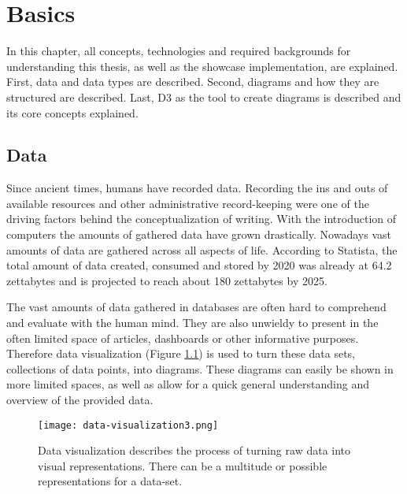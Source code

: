 \chapter{Basics}

In this chapter, all concepts, technologies and required backgrounds for understanding this thesis, as well as the showcase implementation, are explained. First, data and data types are described. Second, diagrams and how they are structured are described. Last, D3 as the tool to create diagrams is described and its core concepts explained.


\section{Data}

Since ancient times, humans have recorded data. Recording the ins and outs of available resources and other administrative record-keeping were one of the driving factors behind the conceptualization of writing\cite{senner1991origins}.
With the introduction of computers the amounts of gathered data have grown drastically. Nowadays vast amounts of data are gathered across all aspects of life. According to Statista, the total amount of data created, consumed and stored by 2020 was already at 64.2 zettabytes and is projected to reach about 180 zettabytes by 2025\cite{statista_2022}.

The vast amounts of data gathered in databases are often hard to comprehend and evaluate with the human mind. They are also unwieldy to present in the often limited space of articles, dashboards or other informative purposes. Therefore data visualization (Figure \ref{fig:data-visualization}) is used to turn these data sets, collections of data points, into diagrams. These diagrams can easily be shown in more limited spaces, as well as allow for a quick general understanding and overview of the provided data.

\begin{figure}
    \texttt{[image: data-visualization3.png]}
    \captionsetup{width=0.9\textwidth}
    \caption[data-visualization]{Data visualization describes the process of turning raw data into visual representations. There can be a multitude or possible representations for a data-set.}
    \label{fig:data-visualization}
\end{figure}

